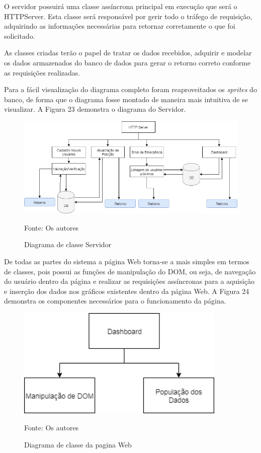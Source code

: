     


O servidor possuirá uma classe assíncrona principal em execução que será o HTTPServer. Esta classe será responsável por gerir todo o tráfego de requisição, adquirindo as informações necessárias para retornar corretamente o que foi solicitado.

As classes criadas terão o papel de tratar os dados recebidos, adquirir e modelar os dados armazenados do banco de dados para gerar o retorno correto conforme as requisições realizadas.

Para a fácil visualização do diagrama completo foram reaproveitados os \textit{sprites} do banco, de forma que o diagrama fosse montado de maneira mais intuitiva de se visualizar. A Figura 23 demonstra o diagrama do Servidor.


\begin{figure}[H]

 \caption{Diagrama de classe Servidor}
\begin{center}
  \includegraphics[width=150mm]{images/Cap3/Diagram_de_Classes_Servidor.png}
  \end{center}
    Fonte: Os autores
\end{figure}

De todas as partes do sistema a página Web torna-se a mais simples em termos de classes, pois possui as funções de manipulação do DOM, ou seja, de navegação do usuário dentro da página e realizar as requisições assíncronas para a aquisição e inserção dos dados nos gráficos existentes dentro da página Web. A Figura 24 demonstra os componentes necessários para o funcionamento da página. 


\begin{figure}[H]

 \caption{Diagrama de classe da pagina Web}
 \begin{center}
  \includegraphics[width=100mm]{images/Cap3/Diagrama_de_Classes_Pagina_Web.png}
  \end{center}
    Fonte: Os autores 
\end{figure}


